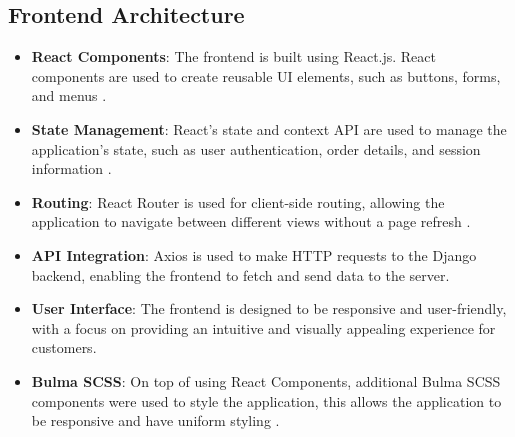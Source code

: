 \subsection{Frontend Architecture}
\begin{itemize}
    \item \textbf{React Components}: The frontend is built using React.js. React components are used to create reusable UI elements, such as buttons, forms, and menus \cite{15}.
    \item \textbf{State Management}: React's state and context API are used to manage the application's state, such as user authentication, order details, and session information \cite{19}.
    \item \textbf{Routing}: React Router is used for client-side routing, allowing the application to navigate between different views without a page refresh \cite{22}.
    \item \textbf{API Integration}: Axios is used to make HTTP requests to the Django backend, enabling the frontend to fetch and send data to the server.
    \item \textbf{User Interface}: The frontend is designed to be responsive and user-friendly, with a focus on providing an intuitive and visually appealing experience for customers.
    \item \textbf{Bulma SCSS}: On top of using React Components, additional Bulma SCSS components were used to style the application, this allows the application to be responsive and have uniform styling \cite{22}.
\end{itemize}

